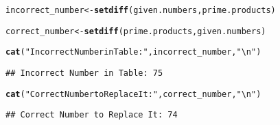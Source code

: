 \documentclass{article}\usepackage[]{graphicx}\usepackage[]{xcolor}
\makeatletter
\newcommand{\hlsng}[1]{\textcolor[rgb]{0.192,0.494,0.8}{#1}}%
\newcommand{\hldef}[1]{\textcolor[rgb]{0.345,0.345,0.345}{#1}}%
\newcommand{\hlkwb}[1]{\textcolor[rgb]{0.69,0.353,0.396}{#1}}%
\newcommand{\hlkwd}[1]{\textcolor[rgb]{0.737,0.353,0.396}{\textbf{#1}}}%
\newenvironment{kframe}{%
 \def\at@end@of@kframe{}%
 \ifinner\ifhmode%
  \def\at@end@of@kframe{\end{minipage}}%
  \begin{minipage}{\columnwidth}%
 \fi\fi%
 \def\FrameCommand##1{\hskip\@totalleftmargin \hskip-\fboxsep
 \colorbox{shadecolor}{##1}\hskip-\fboxsep
     \hskip-\linewidth \hskip-\@totalleftmargin \hskip\columnwidth}%
 \MakeFramed {\advance\hsize-\width
   \@totalleftmargin\z@ \linewidth\hsize
   \@setminipage}}%
 {\par\unskip\endMakeFramed%
 \at@end@of@kframe}
\newenvironment{knitrout}{}{} %
\makeatother
\begin{document}
\begin{enumerate}
\begin{knitrout}
\begin{kframe}
\begin{alltt}
\hldef{incorrect_number} \hlkwb{<-} \hlkwd{setdiff}\hldef{(given.numbers, prime.products)}

\hldef{correct_number} \hlkwb{<-} \hlkwd{setdiff}\hldef{(prime.products, given.numbers)}

\hlkwd{cat}\hldef{(}\hlsng{"Incorrect Number in Table:"}\hldef{, incorrect_number,} \hlsng{"\textbackslash{}n"}\hldef{)}
\end{alltt}
\begin{verbatim}
## Incorrect Number in Table: 75
\end{verbatim}
\begin{alltt}
\hlkwd{cat}\hldef{(}\hlsng{"Correct Number to Replace It:"}\hldef{, correct_number,} \hlsng{"\textbackslash{}n"}\hldef{)}
\end{alltt}
\begin{verbatim}
## Correct Number to Replace It: 74
\end{verbatim}
\end{kframe}
\end{knitrout}
\end{enumerate}


\end{document}
